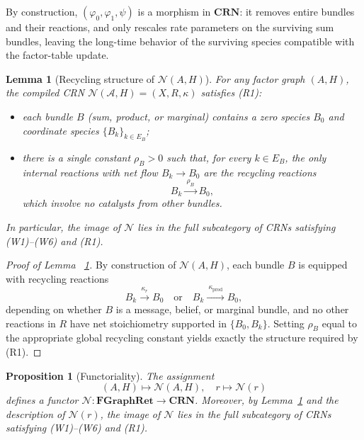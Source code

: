 \documentclass{article}
\theoremstyle{plain}
\newtheorem{proposition}[theorem]{Proposition}
\newtheorem{lemma}[theorem]{Lemma}
\theoremstyle{definition}
\theoremstyle{remark}
\newcommand{\<}{\langle}
\renewcommand{\>}{\rangle}
\begin{document}
By construction, $(\varphi_0, \varphi_1, \psi)$ is a morphism in $\mathbf{CRN}$: it 
removes entire bundles and their reactions, and only rescales rate parameters on the 
surviving sum bundles, leaving the long-time behavior of the surviving species compatible 
with the factor-table update.

\begin{lemma}[Recycling structure of $\mathcal N( A,H)$]\label{lem:recycling-structure}
For any factor graph $(A,H)$, the compiled CRN
$\mathcal N(\mathcal A,H)=(X,R,\kappa)$ satisfies \textup{(R1)}:

\begin{itemize}
  \item each bundle $B$ (sum, product, or marginal) contains a zero species
        $B_0$ and coordinate species $\{B_k\}_{k\in E_B}$;
  \item there is a single constant $\rho_B>0$ such that, for every $k\in E_B$,
        the only internal reactions with net flow $B_k\to B_0$ are the
        recycling reactions
        \[
          B_k \xrightarrow{\ \rho_B\ } B_0,
        \]
        which involve no catalysts from other bundles.
\end{itemize}
In particular, the image of $\mathcal N$ lies in the full subcategory of CRNs
satisfying \textup{(W1)--(W6)} and \textup{(R1)}.
\end{lemma}
\begin{proof}[Proof of Lemma ~\ref{lem:recycling-structure}]
By construction of $\mathcal N(A,H)$, each bundle $B$ is equipped with
recycling reactions
\[
  B_k \xrightarrow{\ \kappa_r\ } B_0 \quad\text{or}\quad
  B_k \xrightarrow{\ \kappa_{\mathrm{prod}}\ } B_0,
\]
depending on whether $B$ is a message, belief, or marginal bundle, and no
other reactions in $R$ have net stoichiometry supported in $\{B_0,B_k\}$.
Setting $\rho_B$ equal to the appropriate global recycling constant yields
exactly the structure required by \textup{(R1)}.
\end{proof}

\begin{proposition}[Functoriality]\label{prop:functoriality}
The assignment
\[
(A, H) \longmapsto \mathcal{N}(A, H), \quad r \longmapsto \mathcal{N}(r)
\]
defines a functor $\mathcal{N} : \mathbf{FGraphRet} \to \mathbf{CRN}$. Moreover, by 
Lemma~\ref{lem:recycling-structure} and the description of $\mathcal{N}(r)$, the image 
of $\mathcal{N}$ lies in the full subcategory of CRNs satisfying \emph{(W1)--(W6)} and \emph{(R1)}.
\end{proposition}
\end{document}
